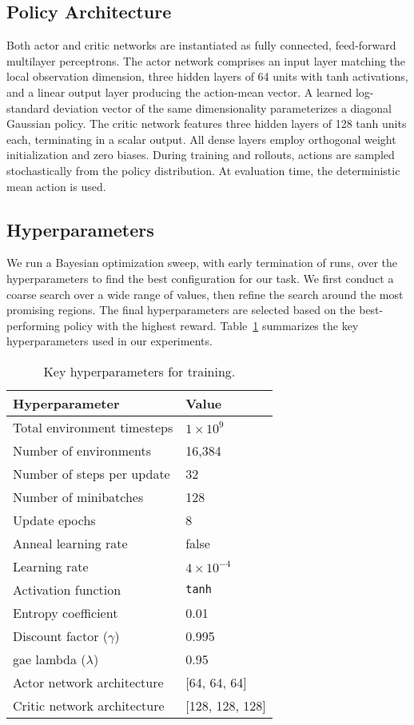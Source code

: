 \subsection{Policy Architecture}
Both actor and critic networks are instantiated as fully connected, feed-forward multilayer perceptrons. The actor network comprises an input layer matching the local observation dimension, three hidden layers of 64 units with tanh activations, and a linear output layer producing the action-mean vector. A learned log-standard deviation vector of the same dimensionality parameterizes a diagonal Gaussian policy. The critic network features three hidden layers of 128 tanh units each, terminating in a scalar output. All dense layers employ orthogonal weight initialization and zero biases. During training and rollouts, actions are sampled stochastically from the policy distribution. At evaluation time, the deterministic mean action is used.

\subsection{Hyperparameters}
We run a Bayesian optimization sweep, with early termination of runs, over the hyperparameters to find the best configuration for our task. We first conduct a coarse search over a wide range of values, then refine the search around the most promising regions. The final hyperparameters are selected based on the best-performing policy with the highest reward. Table~\ref{tab:hyperparams} summarizes the key hyperparameters used in our experiments.

\begin{table}[ht]
  \centering
  \caption{Key hyperparameters for training.}
  \label{tab:hyperparams}
  \begin{tabular}{@{}ll@{}}
    \toprule
    Hyperparameter & Value \\
    \midrule
    Total environment timesteps    & $1\times10^{9}$ \\
    Number of environments & 16,384 \\
    Number of steps per update & 32 \\
    Number of minibatches & 128 \\
    Update epochs & 8 \\
    Anneal learning rate & false \\
    Learning rate & $4\times10^{-4}$ \\
    Activation function & \texttt{tanh} \\
    Entropy coefficient & 0.01 \\
    Discount factor ($\gamma$) & 0.995 \\
    \gls{gae} lambda ($\lambda$) & 0.95 \\

    Actor network architecture & [64, 64, 64] \\
    Critic network architecture & [128, 128, 128] \\
    \bottomrule
  \end{tabular}
\end{table}



